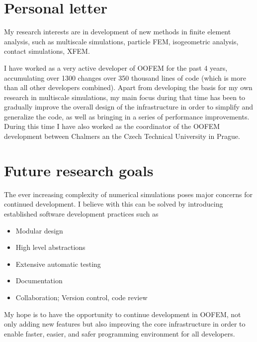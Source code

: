 \documentclass{article}
\begin{document}
\section{Personal letter}
My research interests are in development of new methods in finite element analysis, such as multiscale simulations, particle FEM, isogeometric analysis, contact simulations, XFEM.

I have worked as a very active developer of OOFEM for the past 4 years, accumulating over 1300 changes over 350 thousand lines of code (which is more than all other developers combined).
Apart from developing the basis for my own research in multiscale simulations, my main focus during that time has been to gradually improve the overall design of the infrastructure in order to simplify and generalize the code, as well as bringing in a series of performance improvements.
During this time I have also worked as the coordinator of the OOFEM development between Chalmers an the Czech Technical University in Prague.

\section{Future research goals}
The ever increasing complexity of numerical simulations poses major concerns for continued development.
I believe with this can be solved by introducing established software development practices such as
\begin{itemize}
 \item Modular design
 \item High level abstractions
 \item Extensive automatic testing
 \item Documentation
 \item Collaboration; Version control, code review
\end{itemize}
My hope is to have the opportunity to continue development in OOFEM, not only adding new features but also improving the core infrastructure in order to enable faster, easier, and safer programming environment for all developers.
\end{document}
